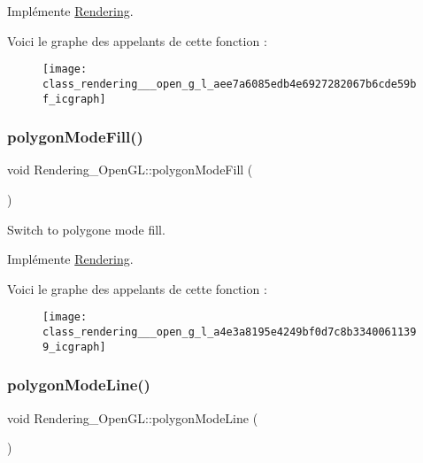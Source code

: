 Implémente \hyperlink{class_rendering_aa753ed0c94b2ece92afd26a58aef4f79}{Rendering}.

Voici le graphe des appelants de cette fonction \+:\nopagebreak
\begin{figure}[H]
\begin{center}
\leavevmode
\texttt{[image: class\_rendering\_\_\_open\_g\_l\_aee7a6085edb4e6927282067b6cde59bf\_icgraph]}
\end{center}
\end{figure}
\mbox{\label{class_rendering___open_g_l_a4e3a8195e4249bf0d7c8b33400611399}} 
\subsubsection{\texorpdfstring{polygon\+Mode\+Fill()}{polygonModeFill()}}
{\footnotesize\ttfamily void Rendering\+\_\+\+Open\+G\+L\+::polygon\+Mode\+Fill (\begin{DoxyParamCaption}{ }\end{DoxyParamCaption})\hspace{0.3cm}{\ttfamily [virtual]}}



Switch to polygone mode fill. 



Implémente \hyperlink{class_rendering_a9ea983c02e590c78d564908d6171335e}{Rendering}.

Voici le graphe des appelants de cette fonction \+:\nopagebreak
\begin{figure}[H]
\begin{center}
\leavevmode
\texttt{[image: class\_rendering\_\_\_open\_g\_l\_a4e3a8195e4249bf0d7c8b33400611399\_icgraph]}
\end{center}
\end{figure}
\mbox{\label{class_rendering___open_g_l_a7742b4b96b3e06a021f143d17fd432df}} 
\subsubsection{\texorpdfstring{polygon\+Mode\+Line()}{polygonModeLine()}}
{\footnotesize\ttfamily void Rendering\+\_\+\+Open\+G\+L\+::polygon\+Mode\+Line (\begin{DoxyParamCaption}{ }\end{DoxyParamCaption})\hspace{0.3cm}{\ttfamily [virtual]}}



